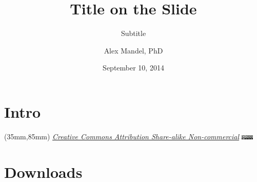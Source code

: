 \documentclass{beamer}
\title[PDFTitle]{Title on the Slide}
\subtitle[Sub]{Subtitle}
\author[A. Mandel]{Alex Mandel, PhD} %
\institute[UCD]{
  Geography Graduate Group\\
  University of California, Davis\\
  \texttt{aimandel@ucdavis.edu}\\
  @aimandel
}
\date[Sep 2014]{September 10, 2014}
\newenvironment{reference}[2]{%
  \begin{textblock*}{\textwidth}(#1,#2) 
      \footnotesize\it\bgroup\color{black}}{\egroup\end{textblock*}}
\begin{document}
\section{Intro}
\begin{frame}[plain]
  \titlepage
   \begin{reference}{35mm}{85mm}
		\tiny \href{http://creativecommons.org/licenses/by-nc-sa/3.0/}{Creative Commons Attribution Share-alike Non-commercial}
		\includegraphics[width=22px]{cc-a-nc-sa-88x31.png}
   \end{reference} 
\end{frame}


\section{Downloads}
\end{document}

